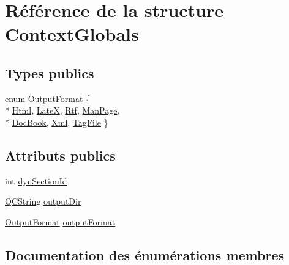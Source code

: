 \hypertarget{struct_context_globals}{}\section{Référence de la structure Context\+Globals}
\label{struct_context_globals}
\subsection*{Types publics}
\begin{DoxyCompactItemize}
\item 
enum \hyperlink{struct_context_globals_ab4a090d190721e2a4ecee2a0258300fb}{Output\+Format} \{ \\*
\hyperlink{struct_context_globals_ab4a090d190721e2a4ecee2a0258300fbad7f0f85cd621ca4d2d4c05f7d6bd3d35}{Html}, 
\hyperlink{struct_context_globals_ab4a090d190721e2a4ecee2a0258300fba69de1e2560f0c669c63ed2e2abab2989}{Late\+X}, 
\hyperlink{struct_context_globals_ab4a090d190721e2a4ecee2a0258300fbaecbcfbaf20c9a1f787cefd127f244fdf}{Rtf}, 
\hyperlink{struct_context_globals_ab4a090d190721e2a4ecee2a0258300fbac57ee0a8995af75f9101b713ccf55caf}{Man\+Page}, 
\\*
\hyperlink{struct_context_globals_ab4a090d190721e2a4ecee2a0258300fbaff425161d57616a739238893124b375b}{Doc\+Book}, 
\hyperlink{struct_context_globals_ab4a090d190721e2a4ecee2a0258300fba0cf6d648af325099a320be72bc49553f}{Xml}, 
\hyperlink{struct_context_globals_ab4a090d190721e2a4ecee2a0258300fba3a8afc7e0e0be6980ae3a8a5dd8b0c01}{Tag\+File}
 \}
\end{DoxyCompactItemize}
\subsection*{Attributs publics}
\begin{DoxyCompactItemize}
\item 
int \hyperlink{struct_context_globals_aa8f55e29c7473839278831567228fed2}{dyn\+Section\+Id}
\item 
\hyperlink{class_q_c_string}{Q\+C\+String} \hyperlink{struct_context_globals_a258997491223c384351384e24c73a63e}{output\+Dir}
\item 
\hyperlink{struct_context_globals_ab4a090d190721e2a4ecee2a0258300fb}{Output\+Format} \hyperlink{struct_context_globals_abe47e0b334f66da7db51ac85285abaa1}{output\+Format}
\end{DoxyCompactItemize}


\subsection{Documentation des énumérations membres}
\hypertarget{struct_context_globals_ab4a090d190721e2a4ecee2a0258300fb}{}
